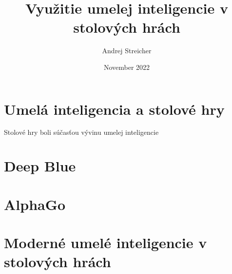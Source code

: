 \documentclass[12pt, a4paper]{report}
\begin{document}
\title{Využitie umelej inteligencie v stolových hrách}
\author{Andrej Streicher}
\date{November 2022}
\maketitle
\tableofcontents
\listoffigures

 

\chapter{Umelá inteligencia a stolové hry}
Stolové hry boli súčasťou vývinu umelej inteligencie 
\chapter{Deep Blue}
\chapter{AlphaGo}
\chapter{Moderné umelé inteligencie v stolových hrách}
{}

\end{document}
